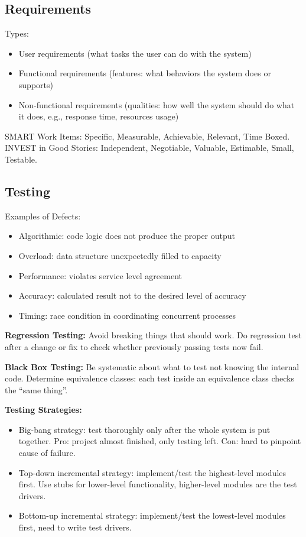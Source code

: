 \documentclass[8pt, letterpaper, titlepage]{article}
\begin{document}
\begin{multicols*}{2}
\subsection*{Requirements}

Types:
\begin{itemize}
    \item User requirements (what tasks the user can do with the system)
    \item Functional requirements (features: what behaviors the system does or supports)
    \item Non-functional requirements (qualities: how well the system should do what it does, e.g., response time, resources usage)
\end{itemize}

SMART Work Items: Specific, Measurable, Achievable, Relevant, Time Boxed. INVEST in Good Stories: Independent, Negotiable, Valuable, Estimable, Small, Testable.

\subsection*{Testing}

Examples of Defects:
\begin{itemize}
    \item Algorithmic: code logic does not produce the proper output
    \item Overload: data structure unexpectedly filled to capacity
    \item Performance: violates service level agreement
    \item Accuracy: calculated result not to the desired level of accuracy
    \item Timing: race condition in coordinating concurrent processes
\end{itemize}

\textbf{Regression Testing:} Avoid breaking things that should work. Do regression test after a change or fix to check whether previously passing tests now fail.

\textbf{Black Box Testing:} Be systematic about what to test not knowing the internal code. Determine equivalence classes: each test inside an equivalence class checks the ``same thing''. 

\textbf{Testing Strategies:}
\begin{itemize}
    \item Big-bang strategy: test thoroughly only after the whole system is put together. Pro: project almost finished, only testing left. Con: hard to pinpoint cause of failure.
    \item Top-down incremental strategy: implement/test the highest-level modules first. Use stubs for lower-level functionality, higher-level modules are the test drivers.
    \item Bottom-up incremental strategy: implement/test the lowest-level modules first, need to write test drivers.
\end{itemize}


\end{multicols*}
\end{document}
